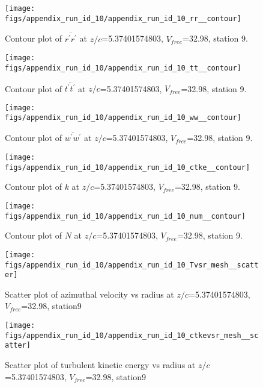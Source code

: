 \begin{figure}[H]
\centering
\texttt{[image: figs/appendix\_run\_id\_10/appendix\_run\_id\_10\_rr\_\_contour]}
\caption{Contour plot of $\overline{r^\prime r^\prime}$ at $z/c$=5.37401574803, $V_{free}$=32.98, station 9.}
\label{fig:appendix_run_id_10_rr__contour}
\end{figure}


\begin{figure}[H]
\centering
\texttt{[image: figs/appendix\_run\_id\_10/appendix\_run\_id\_10\_tt\_\_contour]}
\caption{Contour plot of $\overline{t^\prime t^\prime}$ at $z/c$=5.37401574803, $V_{free}$=32.98, station 9.}
\label{fig:appendix_run_id_10_tt__contour}
\end{figure}


\begin{figure}[H]
\centering
\texttt{[image: figs/appendix\_run\_id\_10/appendix\_run\_id\_10\_ww\_\_contour]}
\caption{Contour plot of $\overline{w^\prime w^\prime}$ at $z/c$=5.37401574803, $V_{free}$=32.98, station 9.}
\label{fig:appendix_run_id_10_ww__contour}
\end{figure}


\begin{figure}[H]
\centering
\texttt{[image: figs/appendix\_run\_id\_10/appendix\_run\_id\_10\_ctke\_\_contour]}
\caption{Contour plot of $k$ at $z/c$=5.37401574803, $V_{free}$=32.98, station 9.}
\label{fig:appendix_run_id_10_ctke__contour}
\end{figure}


\begin{figure}[H]
\centering
\texttt{[image: figs/appendix\_run\_id\_10/appendix\_run\_id\_10\_num\_\_contour]}
\caption{Contour plot of $N$ at $z/c$=5.37401574803, $V_{free}$=32.98, station 9.}
\label{fig:appendix_run_id_10_num__contour}
\end{figure}


\begin{figure}[H]
\centering
\texttt{[image: figs/appendix\_run\_id\_10/appendix\_run\_id\_10\_Tvsr\_mesh\_\_scatter]}
\caption{Scatter plot of azimuthal velocity vs radius at $z/c$=5.37401574803, $V_{free}$=32.98, station9}
\label{fig:appendix_run_id_10_Tvsr_mesh__scatter}
\end{figure}


\begin{figure}[H]
\centering
\texttt{[image: figs/appendix\_run\_id\_10/appendix\_run\_id\_10\_ctkevsr\_mesh\_\_scatter]}
\caption{Scatter plot of turbulent kinetic energy vs radius at $z/c$=5.37401574803, $V_{free}$=32.98, station9}
\label{fig:appendix_run_id_10_ctkevsr_mesh__scatter}
\end{figure}


